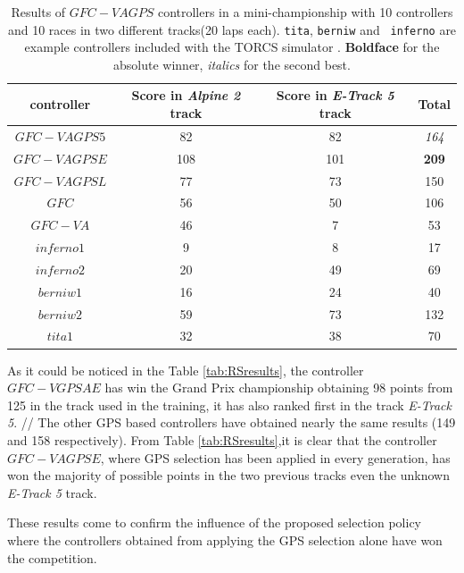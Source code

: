 \documentclass[10pt,journal,compsoc]{IEEEtran}
\begin{document}
%
\begin{table}[ht]
	\centering
	{\scriptsize
		\caption{ Results of $GFC-VAGPS$ controllers in a mini-championship with 10 controllers and 10
			races in two different tracks(20 laps each). {\tt tita}, {\tt berniw} and {\tt
				inferno} are example controllers included with the TORCS
			simulator \cite{torcs4}. {\bf Boldface}
                      for the absolute winner, {\em italics} for the second
                    best.}
		{
			\begin{tabular}{|c|c|c||c|}
				\hline
				controller&Score in \textit{Alpine 2} track &Score in \textit{E-Track 5} track &Total\\
				\hline
				\hline	
				$GFC-VAGPS5$ \cite{DBLP:conf/cig/SalemMG19}&	82&	82&	{\em 164}\\
				$GFC-VAGPSE$&	108&    101&	{\bf 209}\\
				$GFC-VAGPSL$\cite{DBLP:conf/cig/SalemMG19}&	77&	73&	150\\
				$GFC$  \cite{salem_cig2018}&	56&	50&	106\\
				$GFC-VA$ \cite{DBLP:conf/cig/SalemMG19}&	46&	7&	53\\
				$inferno1$&	9&	8&	17\\
				$inferno2$&	20&	49&	69\\
				$berniw1$&	16&	24&	40\\
				$berniw2$&	59&	73&	132\\
				$tita1$&	32&	38&	70\\			
				\hline
				
			\end{tabular}
		}\label{tab:VaryingalphaRSresults}
	}
\end{table}
%
As it could be noticed in the Table \ref{tab:RSresults}, the controller $GFC-VGPSAE$ has win the Grand Prix championship obtaining 98 points from 125 in the track used in the training, it has also ranked first in the track  \textit{E-Track 5}. //
The other GPS based controllers have obtained nearly the same results (149 and 158 respectively).
From Table \ref{tab:RSresults},it is clear that the controller $GFC-VAGPSE$, where GPS selection has been applied in every generation, has won the majority of possible points in the two previous tracks even the unknown \textit{E-Track 5}  track.

These results come to confirm the influence of the proposed selection policy where the controllers obtained from applying the GPS selection alone have won the competition.
 
\end{document}
